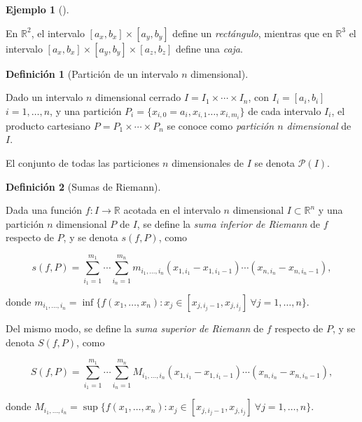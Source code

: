 \documentclass[
  a4paper,
]{scrreport}
\theoremstyle{definition}
\newtheorem{example}{Ejemplo}[chapter]
\theoremstyle{plain}
\theoremstyle{definition}
\newtheorem{definition}{Definición}[chapter]
\theoremstyle{definition}
\theoremstyle{plain}
\theoremstyle{plain}
\theoremstyle{remark}
\begin{document}
\begin{example}[]
\begin{tcolorbox}
En \(\mathbb{R}^2\), el intervalo \([a_x,b_x]\times [a_y,b_y]\) define
un \emph{rectángulo}, mientras que en \(\mathbb{R}^3\) el intervalo
\([a_x,b_x]\times [a_y,b_y]\times [a_z,b_z]\) define una \emph{caja}.

\end{tcolorbox}

\begin{definition}[Partición de un intervalo \(n\)
dimensional]\protect\hypertarget{def-particion-n-dimensional}{}\label{def-particion-n-dimensional}

Dado un intervalo \(n\) dimensional cerrado
\(I=I_1\times\cdots\times I_n\), con \(I_i=[a_i,b_i]\) \(i=1,\ldots,n\),
y una partición \(P_i=\{x_{i,0}=a_i,x_{i,1}\ldots,x_{i,m_i}\}\) de cada
intervalo \(I_i\), el producto cartesiano
\(P=P_1\times\cdots\times P_n\) se conoce como \emph{partición \(n\)
dimensional} de \(I\).

El conjunto de todas las particiones \(n\) dimensionales de \(I\) se
denota \(\mathcal{P}(I)\).

\end{definition}

\begin{definition}[Sumas de
Riemann]\protect\hypertarget{def-suma-inferior-superior-riemann-n-dimensional}{}\label{def-suma-inferior-superior-riemann-n-dimensional}

Dada una función \(f:I\to \mathbb{R}\) acotada en el intervalo \(n\)
dimensional \(I\subset \mathbb{R}^n\) y una partición \(n\) dimensional
\(P\) de \(I\), se define la \emph{suma inferior de Riemann} de \(f\)
respecto de \(P\), y se denota \(s(f,P)\), como

\[
s(f,P) = \sum_{i_1=1}^{m_1}\cdots \sum_{i_n=1}^{m_n} m_{i_1,\ldots,i_n} (x_{1,i_1}-x_{1,i_1-1})\cdots (x_{n,i_n}-x_{n,i_n-1}),
\]

donde
\(m_{i_1,\ldots,i_n} = \inf\{f(x_1,\ldots,x_n): x_j\in[x_{j,i_j-1}, x_{j,i_j}]\ \forall j=1,\ldots, n\}\).

Del mismo modo, se define la \emph{suma superior de Riemann} de \(f\)
respecto de \(P\), y se denota \(S(f,P)\), como

\[
S(f,P) = \sum_{i_1=1}^{m_1}\cdots \sum_{i_n=1}^{m_n} M_{i_1,\ldots,i_n} (x_{1,i_1}-x_{1,i_1-1})\cdots (x_{n,i_n}-x_{n,i_n-1}),
\]

donde
\(M_{i_1,\ldots,i_n} = \sup\{f(x_1,\ldots,x_n): x_j\in[x_{j,i_j-1}, x_{j,i_j}]\ \forall j=1,\ldots, n\}\).

\end{definition}


\end{example}
\end{document}
